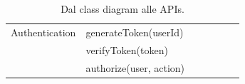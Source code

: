 \documentclass[9pt]{extarticle}
\begin{document}
\begin{table}[!htb]
\begin{tabular}{lllllll}
Authentication  & generateToken(userId)                &             &                    &         &          &      \\
                & verifyToken(token)                   &             &                    &         &          &      \\
                & authorize(user, action)              &             &                    &         &          &      \\\bottomrule
\end{tabular}
\caption{Dal class diagram alle APIs.}
\label{tab:class2API}
\end{table}
\end{document}

